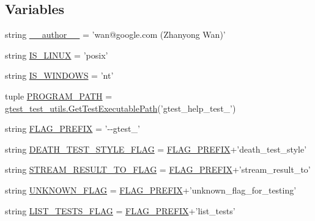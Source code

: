 \subsection*{Variables}
\begin{DoxyCompactItemize}
\item 
string \hyperlink{namespacegtest__help__test_aaad2d635f301ee74567f210b26c828b1}{\-\_\-\-\_\-author\-\_\-\-\_\-} = 'wan@google.\-com (Zhanyong Wan)'
\item 
string \hyperlink{namespacegtest__help__test_ae61a149d50be253176a139fbe6712582}{I\-S\-\_\-\-L\-I\-N\-U\-X} = 'posix'
\item 
string \hyperlink{namespacegtest__help__test_a0f8d4b00fc83b1e72bbb5eca5f3bc4d7}{I\-S\-\_\-\-W\-I\-N\-D\-O\-W\-S} = 'nt'
\item 
tuple \hyperlink{namespacegtest__help__test_a8477d662626da4ff2f370c330bfa7e3f}{P\-R\-O\-G\-R\-A\-M\-\_\-\-P\-A\-T\-H} = \hyperlink{namespacegtest__test__utils_a1bdf3cac86afa675ed37629b183048e9}{gtest\-\_\-test\-\_\-utils.\-Get\-Test\-Executable\-Path}('gtest\-\_\-help\-\_\-test\-\_\-')
\item 
string \hyperlink{namespacegtest__help__test_a9e357a76dd993057c826ec411c9a4b3c}{F\-L\-A\-G\-\_\-\-P\-R\-E\-F\-I\-X} = '-\/-\/gtest\-\_\-'
\item 
string \hyperlink{namespacegtest__help__test_a322bbb8bf27d7701c76fb5704a1fda1f}{D\-E\-A\-T\-H\-\_\-\-T\-E\-S\-T\-\_\-\-S\-T\-Y\-L\-E\-\_\-\-F\-L\-A\-G} = \hyperlink{namespacegtest__help__test_a9e357a76dd993057c826ec411c9a4b3c}{F\-L\-A\-G\-\_\-\-P\-R\-E\-F\-I\-X}+'death\-\_\-test\-\_\-style'
\item 
string \hyperlink{namespacegtest__help__test_a06d67cce3cb57c484c169d1dbe4afd6c}{S\-T\-R\-E\-A\-M\-\_\-\-R\-E\-S\-U\-L\-T\-\_\-\-T\-O\-\_\-\-F\-L\-A\-G} = \hyperlink{namespacegtest__help__test_a9e357a76dd993057c826ec411c9a4b3c}{F\-L\-A\-G\-\_\-\-P\-R\-E\-F\-I\-X}+'stream\-\_\-result\-\_\-to'
\item 
string \hyperlink{namespacegtest__help__test_a400934cf13530098af31e2a65f1a8d84}{U\-N\-K\-N\-O\-W\-N\-\_\-\-F\-L\-A\-G} = \hyperlink{namespacegtest__help__test_a9e357a76dd993057c826ec411c9a4b3c}{F\-L\-A\-G\-\_\-\-P\-R\-E\-F\-I\-X}+'unknown\-\_\-flag\-\_\-for\-\_\-testing'
\item 
string \hyperlink{namespacegtest__help__test_a558dea5edfd6fdb48112401b257f5aea}{L\-I\-S\-T\-\_\-\-T\-E\-S\-T\-S\-\_\-\-F\-L\-A\-G} = \hyperlink{namespacegtest__help__test_a9e357a76dd993057c826ec411c9a4b3c}{F\-L\-A\-G\-\_\-\-P\-R\-E\-F\-I\-X}+'list\-\_\-tests'

\end{DoxyCompactItemize}
